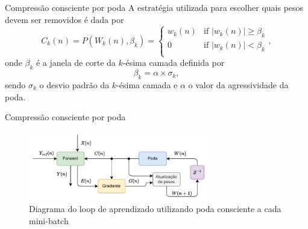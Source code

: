 \begin{frame}{Compressão consciente por poda}
A estratégia utilizada para escolher quais pesos devem ser removidos é dada por 
\begin{equation}
    C_k(n) = P(W_k(n),\beta_k) =
    \begin{cases}
      w_k(n) & \text{if } |w_k(n)|\geq \beta_k \\
      0 & \text{if } |w_k(n)| < \beta_k\\
    \end{cases} ,
\end{equation}
onde $\beta_k$ é a janela de corte da $k$-ésima camada definida por
\begin{equation}
    \beta_k = \alpha \times \sigma_k,
\end{equation}
sendo $\sigma_k$ o desvio padrão da $k$-ésima camada e $\alpha$ o valor da agressividade da poda.

\end{frame}

\begin{frame}{Compressão consciente por poda}
    \begin{figure}[H]
    \centering
    \includegraphics[width=0.7\textwidth]{figuras/prune_scheme.pdf}
    \caption{Diagrama do loop de aprendizado utilizando poda consciente a cada mini-batch}
    \end{figure}
    
\end{frame}



